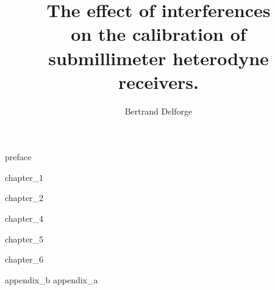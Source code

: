 \documentclass[a4paper,11pt]{book}
\title{
    The effect of interferences\\
    on the calibration of\\
    submillimeter heterodyne receivers.\\
}
\author{Bertrand Delforge}
\newif\ifDraft
\begin{document}
\pagestyle{fancy}

\frontmatter


\ifDraft
    \renewcommand*\contentsname{Content \today}
\fi

\tableofcontents
{preface}

\mainmatter

{chapter_1}

{chapter_2}

{chapter_4}

{chapter_5}

{chapter_6}

\begin{appendices}
   {appendix_b}
   {appendix_a}
\end{appendices}

\backmatter

%


\cleardoublepage
{}
\printbibliography
\end{document}
